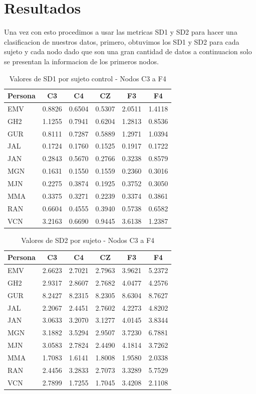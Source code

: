 \section{Resultados}
Una vez con esto procedimos a usar las metricas SD1 y SD2 para hacer una clasificacion de
nuestros datos, primero, obtuvimos los SD1 y SD2 para cada sujeto y cada nodo dado que son una
gran cantidad de datos a continuacion solo se presentan la informacion de los primeros nodos.

\begin{table}[H]
\centering
\caption{Valores de SD1 por sujeto control - Nodos C3 a F4}
\label{tab:sd1_nodos}
\begin{tabular}{lSSSSS}
\toprule
\textbf{Persona} & \textbf{C3} & \textbf{C4} & \textbf{CZ} & \textbf{F3} & \textbf{F4} \\
\midrule
EMV & 0.8826 & 0.6504 & 0.5307 & 2.0511 & 1.4118 \\
GH2 & 1.1255 & 0.7941 & 0.6204 & 1.2813 & 0.8536 \\
GUR & 0.8111 & 0.7287 & 0.5889 & 1.2971 & 1.0394 \\
JAL & 0.1724 & 0.1760 & 0.1525 & 0.1917 & 0.1722 \\
JAN & 0.2843 & 0.5670 & 0.2766 & 0.3238 & 0.8579 \\
MGN & 0.1631 & 0.1550 & 0.1559 & 0.2360 & 0.3016 \\
MJN & 0.2275 & 0.3874 & 0.1925 & 0.3752 & 0.3050 \\
MMA & 0.3375 & 0.3271 & 0.2239 & 0.3374 & 0.3861 \\
RAN & 0.6604 & 0.4555 & 0.3940 & 0.5738 & 0.6582 \\
VCN & 3.2163 & 0.6690 & 0.9445 & 3.6138 & 1.2387 \\
\bottomrule
\end{tabular}
\end{table}

\begin{table}[H]
\centering
\caption{Valores de SD2 por sujeto - Nodos C3 a F4}
\label{tab:sd2_nodos}
\begin{tabular}{lSSSSS}
\toprule
\textbf{Persona} & \textbf{C3} & \textbf{C4} & \textbf{CZ} & \textbf{F3} & \textbf{F4} \\
\midrule
EMV & 2.6623 & 2.7021 & 2.7963 & 3.9621 & 5.2372 \\
GH2 & 2.9317 & 2.8607 & 2.7682 & 4.0477 & 4.2576 \\
GUR & 8.2427 & 8.2315 & 8.2305 & 8.6304 & 8.7627 \\
JAL & 2.2067 & 2.4451 & 2.7602 & 4.2273 & 4.8202 \\
JAN & 3.0633 & 3.2070 & 3.1277 & 4.0145 & 3.8344 \\
MGN & 3.1882 & 3.5294 & 2.9507 & 3.7230 & 6.7881 \\
MJN & 3.0583 & 2.7824 & 2.4490 & 4.1814 & 3.7262 \\
MMA & 1.7083 & 1.6141 & 1.8008 & 1.9580 & 2.0338 \\
RAN & 2.4456 & 3.2833 & 2.7073 & 3.3289 & 5.7529 \\
VCN & 2.7899 & 1.7255 & 1.7045 & 3.4208 & 2.1108 \\
\bottomrule
\end{tabular}
\end{table}

